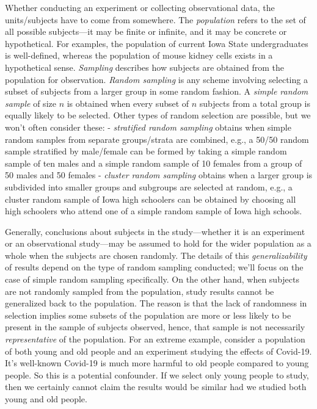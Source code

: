 \documentclass[
]{book}
\theoremstyle{definition}
\theoremstyle{definition}
\theoremstyle{definition}
\theoremstyle{definition}
\theoremstyle{remark}
\begin{document}
Whether conducting an experiment or collecting observational data, the units/subjects have to come from somewhere. The \emph{population} refers to the set of all possible subjects---it may be finite or infinite, and it may be concrete or hypothetical. For examples, the population of current Iowa State undergraduates is well-defined, whereas the population of mouse kidney cells exists in a hypothetical sense. \emph{Sampling} describes how subjects are obtained from the population for observation. \emph{Random sampling} is any scheme involving selecting a subset of subjects from a larger group in some random fashion. A \emph{simple random sample} of size \(n\) is obtained when every subset of \(n\) subjects from a total group is equally likely to be selected. Other types of random selection are possible, but we won't often consider these:
- \emph{stratified random sampling} obtains when simple random samples from separate groups/strata are combined, e.g., a 50/50 random sample stratified by male/female can be formed by taking a simple random sample of ten males and a simple random sample of 10 females from a group of 50 males and 50 females
- \emph{cluster random sampling} obtains when a larger group is subdivided into smaller groups and subgroups are selected at random, e.g., a cluster random sample of Iowa high schoolers can be obtained by choosing all high schoolers who attend one of a simple random sample of Iowa high schools.

Generally, conclusions about subjects in the study---whether it is an experiment or an observational study---may be assumed to hold for the wider population as a whole when the subjects are chosen randomly. The details of this \emph{generalizability} of results depend on the type of random sampling conducted; we'll focus on the case of simple random sampling specifically. On the other hand, when subjects are not randomly sampled from the population, study results cannot be generalized back to the population. The reason is that the lack of randomness in selection implies some subsets of the population are more or less likely to be present in the sample of subjects observed, hence, that sample is not necessarily \emph{representative} of the population. For an extreme example, consider a population of both young and old people and an experiment studying the effects of Covid-19. It's well-known Covid-19 is much more harmful to old people compared to young people. So this is a potential confounder. If we select only young people to study, then we certainly cannot claim the results would be similar had we studied both young and old people.
\end{document}
